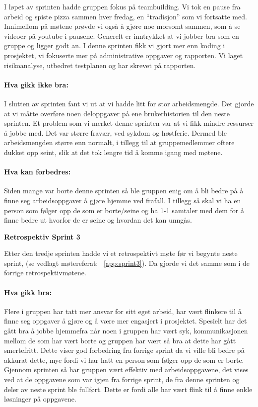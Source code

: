 \documentclass[12pt,a4paper,norsk]{article}
\begin{document}
I løpet av sprinten hadde gruppen fokus på teambuilding. Vi tok en pause fra arbeid og spiste pizza sammen hver fredag, en “tradisjon” som vi fortsatte med. Innimellom på møtene prøvde vi også å gjøre noe morsomt sammen, som å se videoer på youtube i pausene.
Generelt er inntrykket at vi jobber bra som en gruppe og ligger godt an.
I denne sprinten fikk vi gjort mer enn  koding i prosjektet, vi fokuserte mer på administrative oppgaver og rapporten. Vi laget risikoanalyse, utbedret testplanen og har skrevet på rapporten.

\paragraph{Hva gikk ikke bra:}
I slutten av sprinten fant vi ut at vi hadde litt for stor arbeidsmengde. Det gjorde at vi måtte overføre noen deloppgaver på ene brukerhistorien til den neste sprinten.
Et problem som vi merket denne sprinten var at vi fikk mindre ressurser å jobbe med. Det var større fravær, ved sykdom og høstferie. Dermed ble arbeidsmengden større enn normalt, i tillegg til at gruppemedlemmer oftere dukket opp seint, slik at det tok lengre tid å komme igang med møtene.

\paragraph{Hva kan forbedres:}
Siden mange var borte denne sprinten så ble gruppen enig om å bli bedre på å finne seg arbeidsoppgaver å gjøre hjemme ved frafall.
I tillegg så skal vi ha en person som følger opp de som er borte/seine og ha 1-1 samtaler med dem for å finne bedre ut hvorfor de er seine og hvordan det kan unngås.


\bigskip \noindent \textbf{Retrospektiv Sprint 3}
\par Etter den tredje sprinten hadde vi et retrospektivt møte før vi begynte neste sprint, (se vedlagt møtereferat: ~\cref{app:sprint3}). Da gjorde vi det samme som i de forrige retrospektivmøtene.

\paragraph{Hva gikk bra:}
Flere i gruppen har tatt mer ansvar for sitt eget arbeid, har vært flinkere til å finne seg oppgaver å gjøre og å være mer engasjert i prosjektet. Spesielt har det gått bra å jobbe hjemmefra når noen i gruppen har vært syk, kommunikasjonen mellom de som har vært borte og gruppen har vært så bra at dette har gått smertefritt. Dette viser god forbedring fra forrige sprint da vi ville bli bedre på akkurat dette, mye fordi vi har hatt en person som følger opp de som er borte.
Gjennom sprinten så har gruppen vært effektiv med arbeidsoppgavene, det vises ved at de oppgavene som var igjen fra forrige sprint, de fra denne sprinten og deler av neste sprint ble fullført. Dette er fordi alle har vært flink til å finne enkle løsninger på oppgavene.
\end{document}
